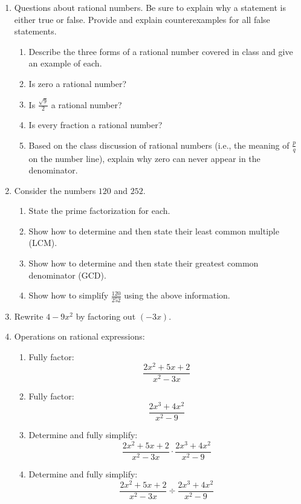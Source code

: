 \documentclass[letterpaper,12pt,fleqn]{article}
\begin{document}
\begin{enumerate}
\item Questions about rational numbers. Be sure to explain why a statement is
  either true or false. Provide and explain counterexamples for all false
  statements.
  \begin{enumerate}
  \item Describe the three forms of a rational number covered in class and give
    an example of each.

  \item Is zero a rational number?

  \item Is $\frac{\sqrt{9}}{2}$ a rational number?

  \item Is every fraction a rational number?

  \item Based on the class discussion of rational numbers (i.e., the meaning
    of $\frac{p}{q}$ on the number line), explain why zero can never appear in
    the denominator.
  \end{enumerate}

\vspace{0.5in}

\item Consider the numbers $120$ and $252$.
  \begin{enumerate}
  \item State the prime factorization for each.
  \item Show how to determine and then state their least common multiple (LCM).
  \item Show how to determine and then state their greatest common denominator
    (GCD).
  \item Show how to simplify $\frac{120}{252}$ using the above information.
  \end{enumerate}

\vspace{0.5in}

\item Rewrite $4-9x^2$ by factoring out $(-3x)$.

\newpage

\newcommand{\rea}{\frac{2x^2+5x+2}{x^2-3x}}
\newcommand{\reb}{\frac{2x^3+4x^2}{x^2-9}}

\item Operations on rational expressions:
  \begin{enumerate}
  \item Fully factor:
    \[\rea\]
  \item Fully factor:
    \[\reb\]
  \item Determine and fully simplify:
    \[\rea\cdot\reb\]
  \item Determine and fully simplify:
    \[\rea\div\reb\]
  \end{enumerate}
\end{enumerate}
\end{document}
